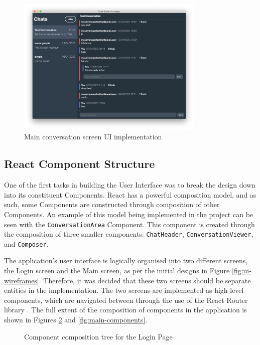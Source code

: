 \begin{figure}[h!]
  \centering
  \includegraphics[width=0.8\textwidth]{images/implementation-main.png}
  \caption{Main conversation screen UI implementation}
  \label{fig:login-ui}
\end{figure}

\subsection{React Component Structure}
One of the first tasks in building the User Interface was to break the design down into its constituent Components. React has a powerful composition model, and as such, some Components are constructed through composition of other Components. An example of this model being implemented in the project can be seen with the \verb|ConversationArea| Component. This component is created through the composition of three smaller components: \verb|ChatHeader|, \verb|ConversationViewer|, and \verb|Composer|.

The application's user interface is logically organised into two different screens, the Login screen and the Main screen, as per the initial designs in Figure \ref{fig:ui-wireframes}. Therefore, it was decided that these two screens should be separate entities in the implementation. The two screens are implemented as high-level components, which are navigated between through the use of the React Router library \cite{react-router}. The full extent of the composition of components in the application is shown in Figures \ref{fig:login-components} and \ref{fig:main-components}.

\begin{figure}[h!]
  \begin{center}
    \caption{Component composition tree for the Login Page}
    \label{fig:login-components}
  \end{center}
\end{figure}


